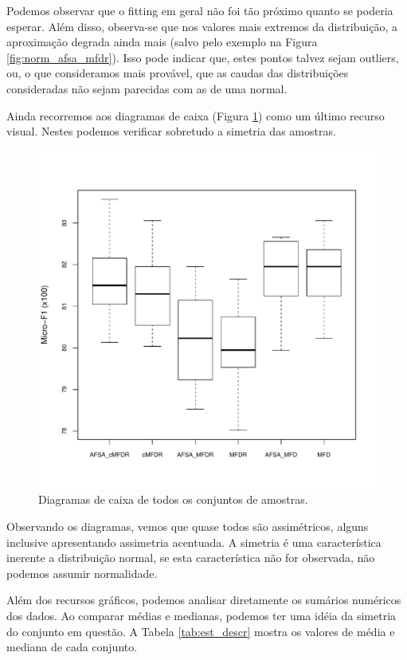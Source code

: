 \documentclass[conference]{IEEEtran}
\begin{document}
Podemos observar que o fitting em geral não foi tão próximo quanto se poderia esperar.
Além disso, observa-se que nos valores mais extremos da distribuição, a aproximação degrada ainda mais (salvo pelo exemplo na Figura \ref{fig:norm_afsa_mfdr}).
Isso pode indicar que, estes pontos talvez sejam outliers, ou, o que consideramos mais provável, que as caudas das distribuições consideradas não sejam parecidas com as de uma normal.

Ainda recorremos aos diagramas de caixa (Figura \ref{fig:boxplot}) como um último recurso visual. 
Nestes podemos verificar sobretudo a simetria das amostras.

\begin{figure}[h]
	\centering
	\includegraphics[width=\linewidth]{img/blueboxplot.pdf}
	\caption{Diagramas de caixa de todos os conjuntos de amostras.}
	\label{fig:boxplot}
\end{figure}

Observando os diagramas, vemos que quase todos são assimétricos, alguns inclusive apresentando assimetria acentuada.
A simetria é uma característica inerente a distribuição normal, se esta característica não for observada, não podemos assumir normalidade.

Além dos recursos gráficos, podemos analisar diretamente os sumários numéricos dos dados.
Ao comparar médias e medianas, podemos ter uma idéia da simetria do conjunto em questão.
A Tabela \ref{tab:est_descr} mostra os valores de média e mediana de cada conjunto.
\end{document}
